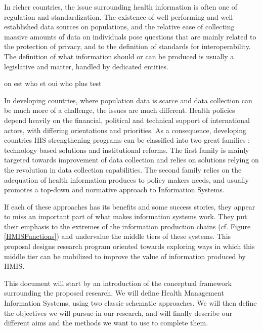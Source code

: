 In richer countries, the issue surrounding health information is often one of regulation and standardization. The  existence of well performing and well established data sources on populations, and the relative ease of collecting massive amounts of data on individuals pose questions that are mainly related to the protection of privacy, and to the definition of standards for interoperability. The definition of what information should or can be produced is usually a legislative and matter, handled by dedicated entities.

on est \gls*{who} et oui \gls*{who} plus \gls*{test}


In developing countries, where population data is scarce and data collection can be much more of a challenge, the issues are much different. Health policies depend heavily on the financial, political and technical support of international actors, with differing orientations and priorities. As a consequence, developing countries HIS strengthening programs can be classified into two great families : technology based solutions and institutional reforms. The first family is mainly targeted towards improvement of data collection and relies on solutions relying on the revolution in  data collection capabilities. The second family relies on the adequation of health information produces to policy makers needs, and usually promotes a top-down and normative approach to Information Systems.

If each of these approaches has its benefits and some success stories,  they appear to miss an important part of what makes information systems work. They put their emphasis to the extremes of the information production chains (cf. Figure \ref{HMISFunctions}) and undervalue the middle tiers of these systems. This proposal designs research program oriented towards exploring ways in which this middle tier can be mobilized to improve the value of information produced by HMIS.

This document will start by an introduction of the conceptual framework surrounding the proposed research. We will define Health Management Information Systems, using two classic schematic approaches. We will then define the objectives we will pursue in our research, and will finally describe our different aims and the methods we want to use to complete them.
